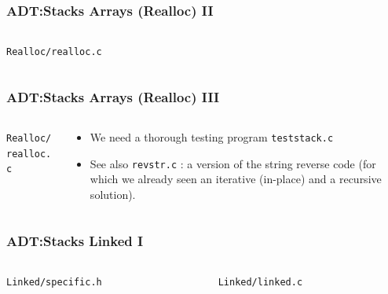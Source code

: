 
\begin{frame}[fragile]
\frametitle{ADT:Stacks Arrays (Realloc) II}
\begin{columns}[T]

\begin{column}{0.50\textwidth}
\verb^Realloc/realloc.c^

\end{column}

\pause
\begin{column}{0.40\textwidth}

\end{column}

\end{columns}
\end{frame}


\begin{frame}[fragile]
\frametitle{ADT:Stacks Arrays (Realloc) III}
\begin{columns}[T]

\begin{column}{0.45\textwidth}
\verb^Realloc/realloc.c^

\end{column}

\pause
\begin{column}{0.45\textwidth}
\begin{itemize}[<+->]
\item We need a thorough testing program \verb^teststack.c^
\item See also \verb^revstr.c^ :  a version of the string reverse code (for which we already seen an iterative (in-place) and a recursive solution).
\end{itemize}
\end{column}

\end{columns}
\end{frame}


\begin{frame}[fragile]
\frametitle{ADT:Stacks Linked I}
\begin{columns}[T]

\begin{column}{0.45\textwidth}
\verb^Linked/specific.h^

\end{column}

\pause
\begin{column}{0.45\textwidth}
\verb^Linked/linked.c^

\end{column}

\end{columns}
\end{frame}

